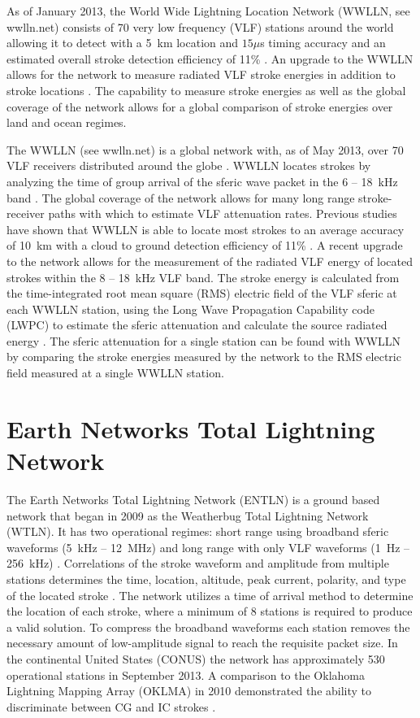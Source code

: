 As of January 2013, the World Wide Lightning Location Network (WWLLN, see wwlln.net) consists of 70 very low frequency (VLF) stations around the world allowing it to detect with a 5~km location and $15\mu$s timing accuracy and an estimated overall stroke detection efficiency of 11\% \citep{Hutchins2012a, Abarca2010,Rodger2009}.
An upgrade to the WWLLN allows for the network to measure radiated VLF stroke energies in addition to stroke locations \citep{Hutchins2012}.
The capability to measure stroke energies as well as the global coverage of the network allows for a global comparison of stroke energies over land and ocean regimes.

The WWLLN (see wwlln.net) is a global network with, as of May 2013, over 70 VLF receivers distributed around the globe \citep{Rodger2006, Rodger2009}.
WWLLN locates strokes by analyzing the time of group arrival of the sferic wave packet in the 6 -- 18~kHz band \citep{Dowden2000}.
The global coverage of the network allows for many long range stroke-receiver paths with which to estimate VLF attenuation rates.
Previous studies have shown that WWLLN is able to locate most strokes to an average accuracy of 10~km with a cloud to ground detection efficiency of 11\% \citep{Abarca2010, Rodger2009}.
A recent upgrade to the network allows for the measurement of the radiated VLF energy of located strokes within the 8 -- 18~kHz VLF band.
The stroke energy is calculated from the time-integrated root mean square (RMS) electric field of the VLF sferic at each WWLLN station, using the Long Wave Propagation Capability code (LWPC) \citep{Ferguson1998} to estimate the sferic attenuation and calculate the source radiated energy \citep{Hutchins2012}.
The sferic attenuation for a single station can be found with WWLLN by comparing the stroke energies measured by the network to the RMS electric field measured at a single WWLLN station.

\section{Earth Networks Total Lightning Network}

The Earth Networks Total Lightning Network (ENTLN) is a ground based network that began in 2009 as the Weatherbug Total Lightning Network (WTLN).
It has two operational regimes: short range using broadband sferic waveforms (5~kHz -- 12~MHz) and long range with only VLF waveforms (1~Hz -- 256~kHz) \citep{Heckman2010}.
Correlations of the stroke waveform and amplitude from multiple stations determines the time, location, altitude, peak current, polarity, and type of the located stroke \citep{Liu2011a}.
The network utilizes a time of arrival method to determine the location of each stroke, where a minimum of 8 stations is required to produce a valid solution.
To compress the broadband waveforms each station removes the necessary amount of low-amplitude signal to reach the requisite packet size.
In the continental United States (CONUS) the network has approximately 530 operational stations in September 2013.
A comparison to the Oklahoma Lightning Mapping Array (OKLMA) in 2010 demonstrated the ability to discriminate between CG and IC strokes \citep{Beasley2010}.

